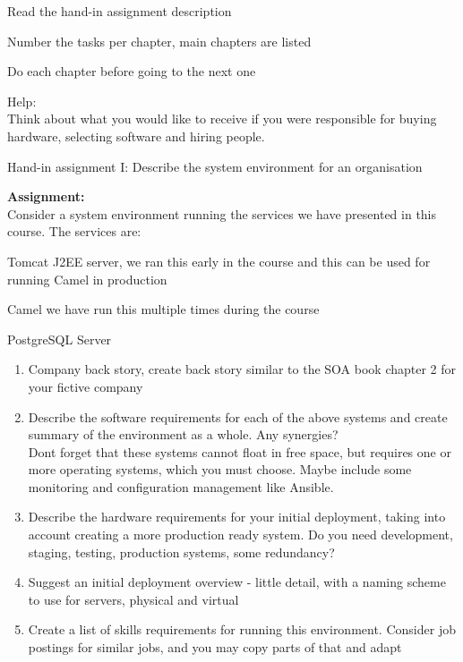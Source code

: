 \documentclass[Screen16to9,17pt]{foils}
\begin{document}
\begin{list2}
  \item Read the hand-in assignment description
  \item Number the tasks per chapter, main chapters are listed
  \item Do each chapter before going to the next one
\end{list2}

Help:\\
Think about what you would like to receive if you were responsible for buying hardware, selecting software and hiring people.



Hand-in assignment I: Describe the system environment for an organisation

{\bf Assignment:}\\
Consider a system environment running the services we have presented in this course. The services are:

\begin{list2}
\item Tomcat J2EE server, we ran this early in the course and this can be used for running Camel in production
\item Camel we have run this multiple times during the course
\item PostgreSQL Server
\end{list2}


\begin{enumerate}
\item Company back story, create back story similar to the SOA book chapter 2 for your fictive company
\item Describe the software requirements for each of the above systems and create summary of the environment as a whole. Any synergies?\\
Dont forget that these systems cannot float in free space, but requires one or more operating systems, which you must choose. Maybe include some monitoring and configuration management like Ansible.
\item Describe the hardware requirements for your initial deployment, taking into account creating a more production ready system. Do you need development, staging, testing, production systems, some redundancy?
\item Suggest an initial deployment overview - little detail, with a naming scheme to use for servers, physical and virtual
\item Create a list of skills requirements for running this environment. Consider job postings for similar jobs, and you may copy parts of that and adapt
\end{enumerate}
\end{document}
